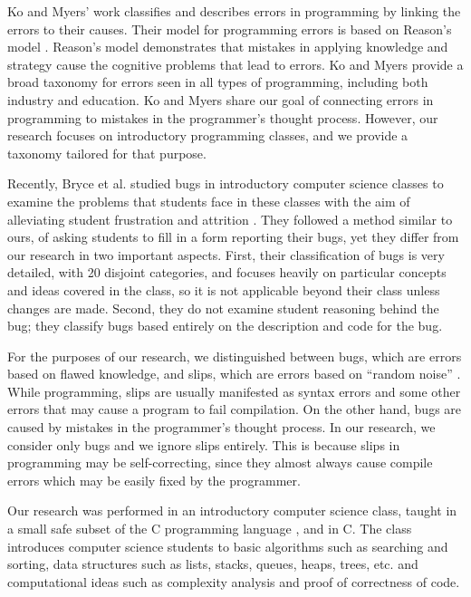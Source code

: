 \documentclass{sig-alternate}
\begin{document}
Ko and Myers' work \cite{KoMyers03} classifies and describes errors in
programming by linking the errors to their causes. Their model for
programming errors is based on Reason's model \cite{Reason90}.
Reason's model demonstrates that mistakes in applying knowledge and
strategy cause the cognitive problems that lead to errors. Ko and
Myers provide a broad taxonomy for errors seen in all types of
programming, including both industry and education. Ko and Myers share
our goal of connecting errors in programming to mistakes in the
programmer's thought process. However, our research focuses on
introductory programming classes, and we provide a taxonomy tailored
for that purpose.\vspace{8pt}

Recently, Bryce et al. studied bugs in introductory computer science
classes to examine the problems that students face in these classes
with the aim of alleviating student frustration and attrition
\cite{BryceCooleyHansenHayrapetyan10}. They followed a method similar
to ours, of asking students to fill in a form reporting their bugs,
yet they differ from our research in two important aspects. First,
their classification of bugs is very detailed, with 20 disjoint
categories, and focuses heavily on particular concepts and ideas
covered in the class, so it is not applicable beyond their class
unless changes are made.  Second, they do not examine student
reasoning behind the bug; they classify bugs based entirely on the
description and code for the bug.\vspace{8pt}

For the purposes of our research, we distinguished between bugs, which
are errors based on flawed knowledge, and slips, which are errors
based on ``random noise'' \cite{VanLehn90}. While programming, slips
are usually manifested as syntax errors and some other errors that may
cause a program to fail compilation. On the other hand, bugs are
caused by mistakes in the programmer's thought process. In our
research, we consider only bugs and we ignore slips entirely. This is
because slips in programming may be self-correcting, since they almost
always cause compile errors which may be easily fixed by the
programmer.\vspace{8pt}

Our research was performed in an introductory computer science class,
taught in a small safe subset of the C programming language
\cite{Arnold10}, and in C. The class introduces computer science
students to basic algorithms such as searching and sorting, data
structures such as lists, stacks, queues, heaps, trees, etc. and
computational ideas such as complexity analysis and proof of
correctness of code.
\end{document}
